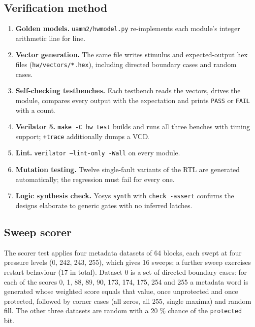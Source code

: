 \documentclass[12pt,a4paper]{report}
\begin{document}
\subsection{Verification method}\label{sec:9_1}
\begin{enumerate}
\item \textbf{Golden models.} \texttt{uamm2/\allowbreak{}hwmodel.\allowbreak{}py} re-implements each module's integer arithmetic line for line.
\item \textbf{Vector generation.} The same file writes stimulus and expected-output hex files (\texttt{hw/\allowbreak{}vectors/\allowbreak{}*.\allowbreak{}hex}), including directed boundary cases and random cases.
\item \textbf{Self-checking testbenches.} Each testbench reads the vectors, drives the module, compares every output with the expectation and prints \texttt{PASS} or \texttt{FAIL} with a count.
\item \textbf{Verilator 5.} \texttt{make -C hw test} builds and runs all three benches with timing support; \texttt{+trace} additionally dumps a VCD.
\item \textbf{Lint.} \texttt{verilator --lint-only -Wall} on every module.
\item \textbf{Mutation testing.} Twelve single-fault variants of the RTL are generated automatically; the regression must fail for every one.
\item \textbf{Logic synthesis check.} Yosys \texttt{synth} with \texttt{check -assert} confirms the designs elaborate to generic gates with no inferred latches.
\end{enumerate}
\subsection{Sweep scorer}\label{sec:9_2}
The scorer test applies four metadata datasets of 64 blocks, each swept at four pressure levels (0, 242, 243, 255), which gives 16 sweeps; a further sweep exercises restart behaviour (17 in total). Dataset 0 is a set of directed boundary cases: for each of the scores 0, 1, 88, 89, 90, 173, 174, 175, 254 and 255 a metadata word is generated whose weighted score equals that value, once unprotected and once protected, followed by corner cases (all zeros, all 255, single maxima) and random fill. The other three datasets are random with a 20 \% chance of the \texttt{protected} bit.
\end{document}
